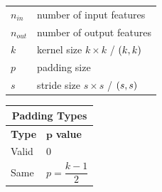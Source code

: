 \begin{table}[h]
    \begin{minipage}[t]{0.5\linewidth}
        \begin{table}[H]
            \begin{tabular}{l l}
                $n_{in}$ & number of input features \\
                $n_{out}$ & number of output features \\
                $k$ & kernel size $k\times k$ / $\left(k, k\right)$ \\
                $p$ & padding size \\
                $s$ & stride size $s\times s$ / $\left(s, s\right)$ \\
            \end{tabular}
        \end{table}        
    \end{minipage}
    \hfill
    \begin{minipage}[t]{0.5\linewidth}
        \begin{table}[H]
            \begin{tabular}{l|l}
                \multicolumn{2}{c}{Padding Types}\\ \hline
                \textbf{Type} & $\mathbf{p}$ \textbf{value} \\ \hline
                Valid & 0 \\
                Same & \( \displaystyle p = \dfrac{k - 1}{2} \) \\
                
            \end{tabular}
        \end{table}        
    \end{minipage}
\end{table}







